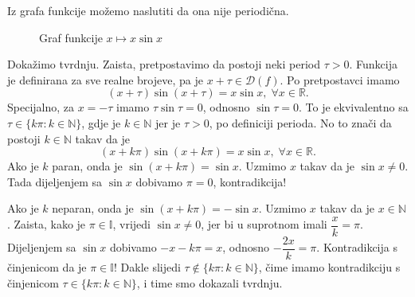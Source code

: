\documentclass{book}
\renewenvironment{proof}{%
    \vspace{-\parskip}\begin{oldproof}%
    }{%
    \end{oldproof}%
}
\theoremstyle{definition}
\theoremstyle{definition}
\theoremstyle{remark}
\begin{document}
\begin{proof}[Rješenje]
Iz grafa funkcije možemo naslutiti da ona nije periodična.
\begin{figure}[ht]
\begin{center}
\end{center}
\caption{\label{gr6} Graf funkcije $x\mapsto x\sin{x}$}
\end{figure}

Dokažimo tvrdnju. Zaista, pretpostavimo da postoji neki period $\tau>0$. Funkcija je definirana za sve realne brojeve, pa je $x+\tau\in \mathcal{D}(f)$. Po pretpostavci imamo $$(x+\tau)\sin(x+\tau)=x\sin{x},\; \forall x\in \mathbb{R}.$$ 
Specijalno, za $x=-\tau$ imamo $\tau\sin{\tau}=0$, odnosno $\sin{\tau}=0$. To je ekvivalentno sa $\tau\in \{k\pi : k\in \mathbb{N}\}$, gdje je $k\in \mathbb{N}$ jer je $\tau>0$, po definiciji perioda. No to znači da postoji $k\in \mathbb{N}$ takav da je $$(x+k\pi)\sin(x+k\pi)=x\sin{x},\;\forall x\in \mathbb{R}.$$ Ako je $k$ paran, onda je $\sin(x+k\pi)=\sin{x}$. Uzmimo $x$ takav da je $\sin{x}\neq 0$. Tada dijeljenjem sa $\sin{x}$ dobivamo $\pi=0$, kontradikcija! 

Ako je $k$ neparan, onda je $\sin(x+k\pi)=-\sin{x}$. Uzmimo $x$ takav da je $x\in \mathbb{N}$. Zaista, kako je $\pi\in \mathbb{I}$, vrijedi $\sin{x}\neq 0$, jer bi u suprotnom imali $\dfrac{x}{k}=\pi$. Dijeljenjem sa $\sin{x}$ dobivamo $-x-k\pi=x$, odnosno $-\dfrac{2x}{k}=\pi$. Kontradikcija s činjenicom da je $\pi\in \mathbb{I}$! Dakle slijedi $\tau\notin \{k\pi : k\in \mathbb{N}\}$, čime imamo kontradikciju s činjenicom $\tau\in \{k\pi : k\in \mathbb{N}\}$, i time smo dokazali tvrdnju.
\end{proof}
\newpage
\end{document}
